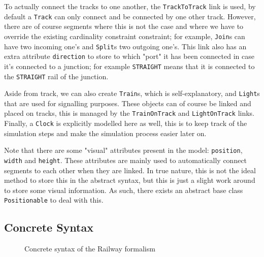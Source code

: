 \documentclass{article}
\begin{document}
To actually connect the tracks to one another, the \texttt{TrackToTrack} link is used, by default a \texttt{Track} can only connect and be connected by one other track. However, there are of course segments where this is not the case and where we have to override the existing cardinality constraint constraint; for example, \texttt{Join}s can have two incoming one's and \texttt{Split}s two outgoing one's. This link also has an extra attribute \texttt{direction} to store to which "port" it has been connected in case it's connected to a junction; for example \texttt{STRAIGHT} means that it is connected to the \texttt{STRAIGHT} rail of the junction.

Aside from track, we can also create \texttt{Train}s, which is self-explanatory, and \texttt{Light}s that are used for signalling purposes. These objects can of course be linked and placed on tracks, this is managed by the \texttt{TrainOnTrack} and \texttt{LightOnTrack} links. Finally, a \texttt{Clock} is explicitly modelled here as well, this is to keep track of the simulation steps and make the simulation process easier later on.

Note that there are some "visual" attributes present in the model: \texttt{position}, \texttt{width} and \texttt{height}. These attributes are mainly used to automatically connect segments to each other when they are linked. In true nature, this is not the ideal method to store this in the abstract syntax, but this is just a slight work around to store some visual information. As such, there exists an abstract base class \texttt{Positionable} to deal with this.

\subsection{Concrete Syntax}

\begin{figure}[H]
    \begin{center}
    \end{center}
    \caption{Concrete syntax of the Railway formalism}
    \label{concrete_syntax}
\end{figure}
\end{document}
